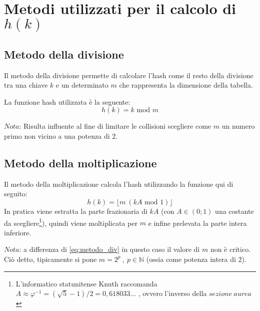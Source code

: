 \section{Metodi utilizzati per il calcolo di \boldmath\texorpdfstring{$h(k)$}{h(k)}} \label{metodi}

\subsection{Metodo della divisione} \label{metodo_div}
Il metodo della divisione permette di calcolare l'hash come il resto della divisione tra una chiave $k$ e un determinato $m$ che rappresenta la dimensione della tabella.

La funzione hash utilizzata è la seguente: 
\begin{equation}
    \label{eq:metodo_div}
    \boxed{h(k)= k \text{ mod }  m}
\end{equation}

$Nota$: Risulta influente al fine di limitare le collisioni scegliere come $m$ un numero primo non vicino a una potenza di $2$.

\subsection{Metodo della moltiplicazione}
\label{metodo_mol}
Il metodo della moltiplicazione calcola l'hash utilizzando la funzione qui di seguito:
\begin{equation}
    \label{eq:metodo_mol}
    \boxed{h(k)= \lfloor m \ (kA \text{ mod } 1) \rfloor}
\end{equation}
In pratica viene estratta la parte frazionaria di $kA$ (con $A \in (0;1)$ una costante da scegliere\footnote{L'informatico statunitense Knuth raccomanda $A \approx \varphi^{-1} = (\sqrt{5}-1)/2 = 0,618033...$ , ovvero l'inverso della $sezione \ aurea$ \cite{fibo_hash} \label{knuth_value} }), quindi viene moltiplicata per $m$ e infine prelevata la parte intera inferiore.

$Nota$: a differenza di \eqref{eq:metodo_div} in questo caso il valore di $m$ non è critico. Ciò detto, tipicamente si pone $m=2^{p} \ , \ p \in \mathbb{N}$  (ossia come potenza intera di $2$).